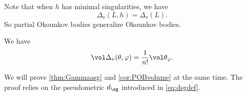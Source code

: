 Note that when $h$ has minimal singularities, we have
\[
\Delta_{\nu}(L,h)=\Delta_{\nu}(L).
\]
So partial Okounkov bodies generalize Okounkov bodies.

\begin{corollary}\label{cor:POBvolume}
    We have
\begin{equation}\label{eq:Okov}
    \vol \Delta_{\nu}(\theta,\varphi)=\frac{1}{n!}\vol \theta_{\varphi}.
\end{equation}
\end{corollary}

We will prove \cref{thm:Gammaasg} and \cref{cor:POBvolume} at the same time. The proof relies on the pseudometric $d_{\sg}$ introduced in \eqref{eq:dsgdef}.

